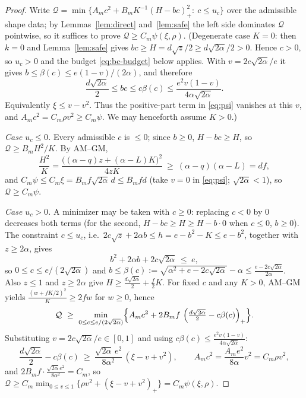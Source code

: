 \documentclass[11pt]{article}
\newcommand{\pos}[1]{\left(#1\right)_{+}}
\newcommand{\cQ}{\mathcal Q}
\begin{document}
\begin{proof}
Write $\cQ=\min\{A_mc^2+B_mK^{-1}\pos{H-bc}^2:\ c\le u_c\}$ over the admissible
shape data; by Lemmas~\ref{lem:direct} and~\ref{lem:safe} the left side
dominates $\cQ$ pointwise, so it suffices to prove
$\cQ\ge C_m\psi(\xi,\rho)$.  (Degenerate case $K=0$: then $k=0$ and
Lemma~\ref{lem:safe} gives
$bc\ge H=d\sqrt z/2\ge d\sqrt{2\alpha}/2>0$.  Hence $c>0$, so
$u_c>0$ and the budget \eqref{eq:bc-budget} below applies.  With
$v=2c\sqrt{2\alpha}/e$ it gives
$b\le\beta(c)\le e(1-v)/(2\alpha)$, and therefore
\[
 \frac{d\sqrt{2\alpha}}2
 \le bc\le c\beta(c)
 \le\frac{e^2v(1-v)}{4\alpha\sqrt{2\alpha}}.
\]
Equivalently $\xi\le v-v^2$.  Thus the positive-part term in
\eqref{eq:psi} vanishes at this $v$, and
$A_mc^2=C_m\rho v^2\ge C_m\psi$.  We may henceforth assume $K>0$.)

\emph{Case $u_c\le0$.}  Every admissible $c$ is $\le0$; since $b\ge0$,
$H-bc\ge H$, so $\cQ\ge B_mH^2/K$.  By AM--GM,
\[
        \frac{H^2}{K}=\frac{\bigl((\alpha-q)z+(\alpha-L)K\bigr)^2}{4zK}
        \ \ge\ (\alpha-q)(\alpha-L)=df ,
\]
and $C_m\psi\le C_m\xi=B_mf\sqrt{2\alpha}\,d\le B_mfd$ (take $v=0$ in
\eqref{eq:psi}; $\sqrt{2\alpha}<1$), so $\cQ\ge C_m\psi$.

\emph{Case $u_c>0$.}  A minimizer may be taken with $c\ge0$: replacing $c<0$ by
$0$ decreases both terms (for the second, $H-bc\ge H\ge H-b\cdot0$ when $c\le0$,
$b\ge0$).  The constraint $c\le u_c$, i.e.\
$2c\sqrt z+2\alpha b\le h=e-b^2-K\le e-b^2$, together with $z\ge2\alpha$, gives
\begin{equation}\label{eq:bc-budget}
        b^2+2\alpha b+2c\sqrt{2\alpha}\ \le\ e ,
\end{equation}
so $0\le c\le e/(2\sqrt{2\alpha})$ and
$b\le\beta(c):=\sqrt{\alpha^2+e-2c\sqrt{2\alpha}}-\alpha
\le\frac{e-2c\sqrt{2\alpha}}{2\alpha}$.
Also $z\le1$ and $z\ge2\alpha$ give
$H\ge\frac{d\sqrt{2\alpha}}2+\frac f2K$.
For fixed $c$ and any $K>0$, AM--GM yields
$\frac{(w+fK/2)^2}{K}\ge2fw$ for $w\ge0$, hence
\[
        \cQ\ \ge\ \min_{0\le c\le e/(2\sqrt{2\alpha})}
        \Bigl\{A_mc^2+2B_mf\,\pos{\tfrac{d\sqrt{2\alpha}}2-c\beta(c)}\Bigr\}.
\]
Substituting $v=2c\sqrt{2\alpha}/e\in[0,1]$ and using
$c\beta(c)\le\frac{e^2v(1-v)}{4\alpha\sqrt{2\alpha}}$:
\[
        \frac{d\sqrt{2\alpha}}2-c\beta(c)
        \ \ge\ \frac{\sqrt{2\alpha}\,e^2}{8\alpha^2}\,(\xi-v+v^2),
        \qquad
        A_mc^2=\frac{A_me^2}{8\alpha}v^2=C_m\rho v^2 ,
\]
and $2B_mf\cdot\frac{\sqrt{2\alpha}e^2}{8\alpha^2}=C_m$, so
$\cQ\ge C_m\min_{0\le v\le1}\{\rho v^2+\pos{\xi-v+v^2}\}=C_m\psi(\xi,\rho)$.
\end{proof}
\end{document}
